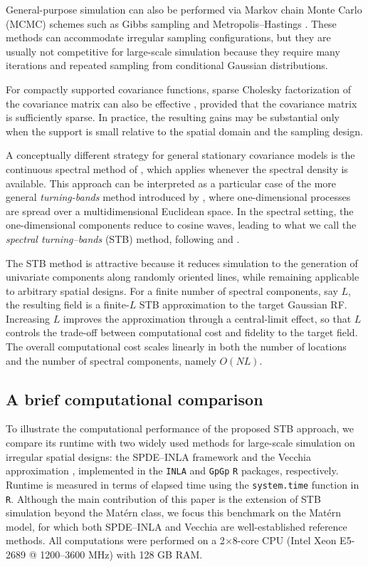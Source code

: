 \documentclass[
  12pt]{article}
\begin{document}
General-purpose simulation can also be performed via Markov chain Monte Carlo (MCMC) schemes such as Gibbs sampling \citep{Geman:Geman:1984} and Metropolis--Hastings \citep{Hastings:1970}.
These methods can accommodate irregular sampling configurations, but they are usually not competitive for large-scale simulation because they require many iterations and repeated sampling from conditional Gaussian distributions.

For compactly supported covariance functions, sparse Cholesky factorization of the covariance matrix can also be effective \citep{da2006,da1989}, provided that the covariance matrix is sufficiently sparse.
In practice, the resulting gains may be substantial only when the support is small relative to the spatial domain and the sampling design.

A conceptually different strategy for general stationary covariance models is the continuous spectral method of \citet{Shinozuka1971,Shinozuka1972}, which applies whenever the spectral density is available.
This approach can be interpreted as a particular case of the more general \emph{turning-bands} method introduced by \citet{Matheron:1973}, where one-dimensional processes are spread over a multidimensional Euclidean space.
In the spectral setting, the one-dimensional components reduce to cosine waves, leading to what we call the \emph{spectral turning--bands} (STB) method, following \citet{Mantoglou:1987} and \citet{emery2016}.

The STB method is attractive because it reduces simulation to the generation of univariate components along randomly oriented lines, while remaining applicable to arbitrary spatial designs.
For a finite number of spectral components, say $L$, the resulting field is a finite-$L$ STB approximation to the target Gaussian RF.
Increasing $L$ improves the approximation through a central-limit effect, so that $L$ controls the trade-off between computational cost and fidelity to the target field.
The overall computational cost scales linearly in both the number of locations and the number of spectral components, namely $O(NL)$.

\subsection{A brief computational comparison}




To illustrate the computational performance of the proposed STB approach, we compare its runtime with two widely used methods for large-scale simulation on irregular spatial designs: the SPDE--INLA framework \citep{Lindgren:Rue:Lindstrom:2011} and the Vecchia approximation \citep{vecchia1988}, implemented in the \texttt{INLA} and \texttt{GpGp} \texttt{R} packages, respectively.
Runtime is measured in terms of elapsed  time using the \texttt{system.time} function in \texttt{R}. Although the main contribution of this paper is the extension of STB simulation beyond the Mat\'ern class, we focus this benchmark on the Mat\'ern model, for which both SPDE--INLA and Vecchia are well-established reference methods. All computations were performed on a 2$\times$8-core CPU (Intel Xeon E5-2689 @ 1200--3600 MHz) with 128 GB RAM.
\end{document}
